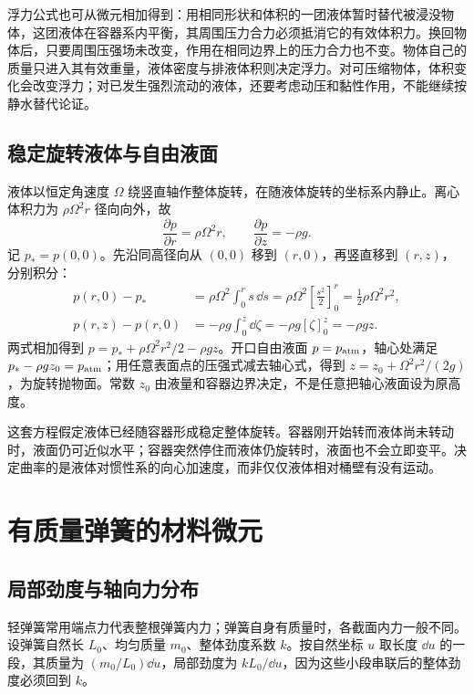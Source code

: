 浮力公式也可从微元相加得到：用相同形状和体积的一团液体暂时替代被浸没物体，这团液体在容器系内平衡，其周围压力合力必须抵消它的有效体积力。换回物体后，只要周围压强场未改变，作用在相同边界上的压力合力也不变。物体自己的质量只进入其有效重量，液体密度与排液体积则决定浮力。对可压缩物体，体积变化会改变浮力；对已发生强烈流动的液体，还要考虑动压和黏性作用，不能继续按静水替代论证。

\subsection{稳定旋转液体与自由液面}
液体以恒定角速度 $\Omega$ 绕竖直轴作整体旋转，在随液体旋转的坐标系内静止。离心体积力为 $\rho\Omega^2r$ 径向向外，故
\[\frac{\partial p}{\partial r}=\rho\Omega^2r,\qquad \frac{\partial p}{\partial z}=-\rho g.\]
记 $p_*=p(0,0)$。先沿同高径向从 $(0,0)$ 移到 $(r,0)$，再竖直移到 $(r,z)$，分别积分：
\begin{align*}
p(r,0)-p_*&=\rho\Omega^2\int_0^r s\,\dd s
=\rho\Omega^2\left[\frac{s^2}{2}\right]_0^r
=\frac12\rho\Omega^2r^2,\\
p(r,z)-p(r,0)&=-\rho g\int_0^z\dd\zeta
=-\rho g[\zeta]_0^z=-\rho gz.
\end{align*}
两式相加得到 $p=p_*+\rho\Omega^2r^2/2-\rho gz$。开口自由液面 $p=p_{\rm atm}$，轴心处满足 $p_*-\rho gz_0=p_{\rm atm}$；用任意表面点的压强式减去轴心式，得到 $z=z_0+\Omega^2r^2/(2g)$，为旋转抛物面。常数 $z_0$ 由液量和容器边界决定，不是任意把轴心液面设为原高度。

这套方程假定液体已经随容器形成稳定整体旋转。容器刚开始转而液体尚未转动时，液面仍可近似水平；容器突然停住而液体仍旋转时，液面也不会立即变平。决定曲率的是液体对惯性系的向心加速度，而非仅仅液体相对桶壁有没有运动。



\section{有质量弹簧的材料微元}
\subsection{局部劲度与轴向力分布}
轻弹簧常用端点力代表整根弹簧内力；弹簧自身有质量时，各截面内力一般不同。设弹簧自然长 $L_0$、均匀质量 $m_0$、整体劲度系数 $k$。按自然坐标 $u$ 取长度 $\dd u$ 的一段，其质量为 $(m_0/L_0)\dd u$，局部劲度为 $kL_0/\dd u$，因为这些小段串联后的整体劲度必须回到 $k$。


